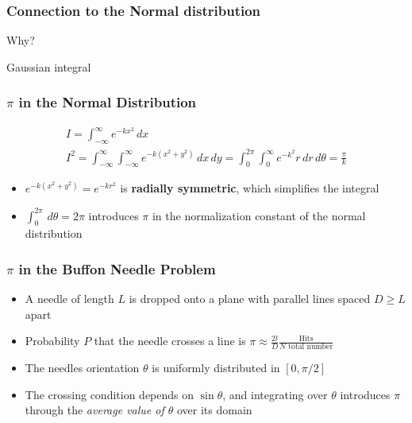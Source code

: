 \documentclass[
  a4paper,
]{scrbook}
\providecommand{\tightlist}{%
  \setlength{\itemsep}{0pt}\setlength{\parskip}{0pt}}\usepackage{longtable,booktabs,array}
\begin{document}
\subsubsection{Connection to the Normal
distribution}\label{connection-to-the-normal-distribution}

Why?

Gaussian integral

\subsubsection{\texorpdfstring{\(\pi\) in the Normal
Distribution}{\textbackslash pi in the Normal Distribution}}\label{pi-in-the-normal-distribution}

\begin{align}
I = \int_{-\infty}^{\infty}e^{-kx^2}\,dx\\
I^2 = \int_{-\infty}^{\infty}\int_{-\infty}^{\infty}e^{-k(x^2+y^2)}\,dx\,dy =  \int_{0}^{2\pi}\int_{0}^{\infty}e^{-k^2}r\,dr\,d\theta = \frac{\pi}{k}
\end{align}

\begin{itemize}
\tightlist
\item
  \(e^{-k(x^2+y^2)}=e^{-kr^2}\) is \textbf{radially symmetric}, which
  simplifies the integral
\item
  \(\int_0^{2\pi}\,d\theta = 2\pi\) introduces \(\pi\) in the
  normalization constant of the normal distribution
\end{itemize}

\subsubsection{\texorpdfstring{\(\pi\) in the Buffon Needle
Problem}{\textbackslash pi in the Buffon Needle Problem}}\label{pi-in-the-buffon-needle-problem}

\begin{itemize}
\item
  A needle of length \(L\) is dropped onto a plane with parallel lines
  spaced \(D \geq L\) apart
\item
  Probability \(P\) that the needle crosses a line is
  \(\pi\approx \frac{2l}{D}\frac{\text{Hits}}{N\text{ total number}}\)
\item
  The needles orientation \(\theta\) is uniformly distributed in
  \([0,\pi/2]\)
\item
  The crossing condition depends on \(\sin{\theta}\), and integrating
  over \(\theta\) introduces \(\pi\) through the \emph{average value of
  \(\theta\)} over its domain
\end{itemize}
\end{document}
